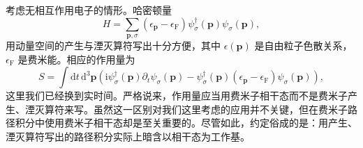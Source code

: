考虑无相互作用电子的情形。哈密顿量
\begin{equation*}
H=\sum_{\mathbf p,\sigma}\left(\epsilon_{\mathbf p}-\epsilon_{\mathrm F}\right)\psi^\dagger_\sigma(\mathbf p)\psi_\sigma(\mathbf p), \tag{12.91}
\end{equation*}
用动量空间的产生与湮灭算符写出十分方便，其中 $\epsilon(\mathbf p)$ 是自由粒子色散关系，$\epsilon_{\mathrm F}$ 是费米能。相应的作用量为
\begin{equation*}
S=\int\mathrm d t\,\mathrm d^3\mathbf p\left(\mathrm i\psi^\dagger_\sigma(\mathbf p)\partial_t\psi_\sigma(\mathbf p)-\psi^\dagger_\sigma(\mathbf p)\left(\epsilon_{\mathbf p}-\epsilon_{\mathrm F}\right)\psi_\sigma(\mathbf p)\right), \tag{12.92}
\end{equation*}
这里我们已经换到实时间。严格说来，作用量应当用费米子相干态而不是费米子产生、湮灭算符来写。虽然这一区别对我们这里考虑的应用并不关键，但在费米子路径积分中使用费米子相干态却是至关重要的。尽管如此，约定俗成的是：用产生、湮灭算符写出的路径积分实际上暗含以相干态为工作基。

